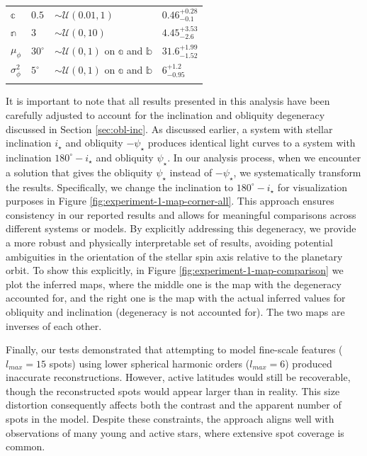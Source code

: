 \documentclass[twocolumn]{aastex631}
\begin{document}
\begin{table}[]
\begin{tabular}{llll}
    $\mathbb{c}$                              & $0.5$                 & $\sim\mathcal{U}(0.01, 1)$           & $0.46^{+0.28}_{-0.1}$                               \\
    $\mathbb{n}$                              & $3$                   & $\sim\mathcal{U}(0, 10)$             & $4.45^{+3.53}_{-2.6}$                               \\
    $\mu_\phi$                                & $30^\circ$            & $\sim\mathcal{U}(0, 1)$ on $\mathbb{a}$ and $\mathbb{b}$ & $31.6^{+1.99}_{-1.52}$                               \\
    $\sigma^2_\phi$                           & $5^\circ$             & $\sim\mathcal{U}(0, 1)$ on $\mathbb{a}$ and $\mathbb{b}$ & $6^{+1.2}_{-0.95}$                      \\ \hline
    \label{tab:LongPriors}
    \end{tabular}
\end{table}
%

It is important to note that all results presented in this analysis have been carefully adjusted to account for the inclination and obliquity 
degeneracy discussed in Section \ref{sec:obl-inc}. As discussed earlier, a system with stellar inclination $i_\star$ and obliquity $-\psi_\star$ 
produces identical light curves to a system with inclination $180^\circ-i_\star$ and obliquity $\psi_\star$. In our analysis process, 
when we encounter a solution that gives the obliquity $\psi_\star$ instead of $-\psi_\star$, we systematically transform the results. 
Specifically, we change the inclination to $180^\circ-i_\star$ for visualization purposes in Figure \ref{fig:experiment-1-map-corner-all}. 
This approach ensures consistency in our reported results and allows for meaningful comparisons across different systems or models. 
By explicitly addressing this degeneracy, we provide a more robust and physically interpretable set of results, avoiding potential ambiguities in the 
orientation of the stellar spin axis relative to the planetary orbit. To show this explicitly, in Figure \ref{fig:experiment-1-map-comparison}
we plot the inferred maps, where the middle one is the map with the degeneracy accounted for, and the right one is the map with the actual inferred values 
for obliquity and inclination (degeneracy is not accounted for). The two maps are inverses of each other.

Finally, our tests demonstrated that attempting to model fine-scale features ($l_{max}=15$ spots) using lower spherical 
harmonic orders ($l_{max}=6$) produced inaccurate reconstructions. However, active latitudes would still be recoverable, 
though the reconstructed spots would appear larger than in reality. This size distortion consequently affects both the contrast 
and the apparent number of spots in the model. Despite these constraints, the approach aligns well with observations of 
many young and active stars, where extensive spot coverage is common. 
\end{document}
